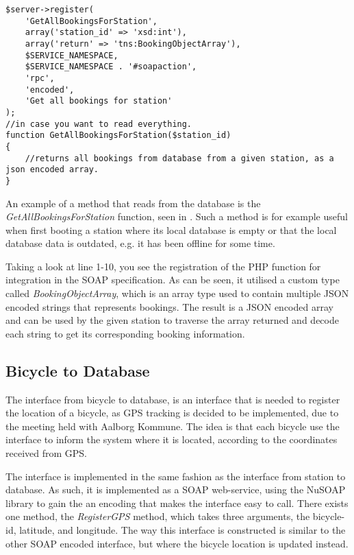 \begin{minipage}{\textwidth}
\begin{lstlisting}[caption = {Method for reading all bookings for a given station}, label = {lst:getallbookingstation}]
$server->register(
	'GetAllBookingsForStation',
	array('station_id' => 'xsd:int'),
	array('return' => 'tns:BookingObjectArray'),
	$SERVICE_NAMESPACE,
	$SERVICE_NAMESPACE . '#soapaction',
	'rpc',
	'encoded',
	'Get all bookings for station'
);
//in case you want to read everything.
function GetAllBookingsForStation($station_id)
{
	//returns all bookings from database from a given station, as a json encoded array.
}
\end{lstlisting}
\end{minipage}

An example of a method that reads from the database is the \textit{GetAllBookingsForStation} function, seen in .
Such a method is for example useful when first booting a station where its local database is empty or that the local database data is outdated, e.g. it has been offline for some time.

Taking a look at line 1-10, you see the registration of the PHP function for integration in the SOAP specification.
As can be seen, it utilised a custom type called \textit{BookingObjectArray}, which is an array type used to contain multiple JSON encoded strings that represents bookings.
The result is a JSON encoded array and can be used by the given station to traverse the array returned and decode each string to get its corresponding booking information.

\subsection{Bicycle to Database}
The interface from bicycle to database, is an interface that is needed to register the location of a bicycle, as GPS tracking is decided to be implemented, due to the meeting held with Aalborg Kommune.
The idea is that each bicycle use the interface to inform the system where it is located, according to the coordinates received from GPS.

The interface is implemented in the same fashion as the interface from station to database.
As such, it is implemented as a SOAP web-service, using the NuSOAP library to gain the an encoding that makes the interface easy to call.
There exists one method, the \textit{RegisterGPS} method, which takes three arguments, the bicycle-id, latitude, and longitude.
The way this interface is constructed is similar to the other SOAP encoded interface, but where the bicycle location is updated instead.